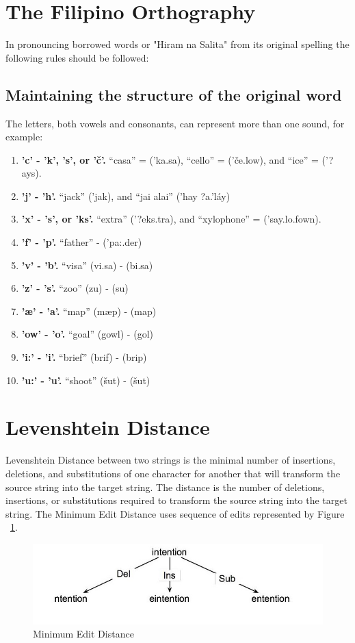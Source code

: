 \documentclass[12pt]{book}
\begin{document}
\section{The Filipino Orthography}
In pronouncing borrowed words or "Hiram na Salita" from its original spelling the following rules should be followed:

\subsection{Maintaining the structure of the original word}
The letters, both vowels and consonants, can represent more than one sound, for example:

\begin{enumerate}
\item \textbf{'c' - 'k', 's', or 'č'.} “casa” = ('ka.sa), “cello” = ('če.low), and “ice” = ('?ays).
\item \textbf{'j' - 'h'.} “jack” ('jak), and “jai alai” ('hay ?a.'láy)
\item \textbf{'x' - 's', or 'ks'.} “extra” ('?eks.tra), and “xylophone” = ('say.lo.fown).
\item \textbf{'f' - 'p'.} “father” - ('pa:.der)
\item \textbf{'v' - 'b'.} “visa” (vi.sa) - (bi.sa) 
\item \textbf{'z' - 's'.} “zoo” (zu) - (su) 
\item \textbf{'æ' - 'a'.} “map” (mæp) - (map)
\item \textbf{'ow' - 'o'.} “goal” (gowl) - (gol)
\item \textbf{'i:' - 'i'.} “brief” (brif) - (brip)
\item \textbf{'u:' - 'u'.} “shoot” (šut) - (šut)
\end{enumerate}

\section{Levenshtein Distance}
Levenshtein Distance between two strings is the minimal number of insertions, deletions, and substitutions of one character for another that will transform the source string into the target string. The distance is the number of deletions, insertions, or substitutions required to transform the source string into the target string. The Minimum Edit Distance uses sequence of edits represented by Figure ~\ref{minedit}.
\begin{figure}[H]
\begin{center}	
\includegraphics[scale=.50]{minedit.jpg}
	\caption[Minimum Edit Distance]
	{Minimum Edit Distance}
	\label{minedit}
\end{center}
\end{figure}
\end{document}

